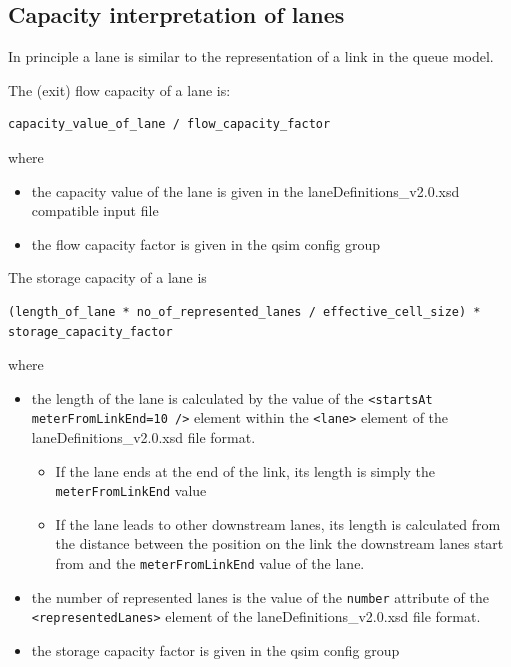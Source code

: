 \subsection{Capacity interpretation of lanes}

In principle a lane is similar to the representation of a link in the queue model. 

The (exit) flow capacity of a lane is:

\begin{verbatim}
capacity_value_of_lane / flow_capacity_factor
\end{verbatim}

where
\begin{itemize}
	\item the capacity value of the lane is given in the laneDefinitions\_v2.0.xsd compatible input file
	\item the flow capacity factor is given in the qsim config group
\end{itemize}

The storage capacity of a lane is

\begin{verbatim}
(length_of_lane * no_of_represented_lanes / effective_cell_size) * storage_capacity_factor
\end{verbatim}

where
\begin{itemize}
	\item the length of the lane is calculated by the value of the \verb$<startsAt meterFromLinkEnd=10 />$ element within the \verb$<lane>$ element of the laneDefinitions\_v2.0.xsd file format. \\
		\begin{itemize}
			\item If the lane ends at the end of the link, its length is simply the \verb$meterFromLinkEnd$ value
			\item If the lane leads to other downstream lanes, its length is calculated from the distance between the position on the link the downstream lanes start from and the \verb$meterFromLinkEnd$ value of the lane. 
		\end{itemize}
	\item the number of represented lanes is the value of the \verb$number$ attribute of the  \verb$<representedLanes>$ element of the laneDefinitions\_v2.0.xsd file format.
	\item the storage capacity factor is given in the qsim config group
\end{itemize}


